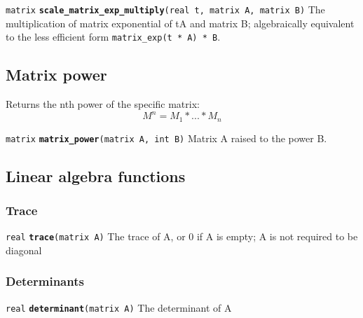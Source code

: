 \documentclass[
  10pt,
]{book}
\begin{document}

\texttt{matrix} \textbf{\texttt{scale\_matrix\_exp\_multiply}}\texttt{(real\ t,\ matrix\ A,\ matrix\ B)}\newline
The multiplication of matrix exponential of tA and matrix B;
algebraically equivalent to the less efficient form \texttt{matrix\_exp(t\ *\ A)\ *\ B}.

\hypertarget{matrix-power}{%
\subsection{Matrix power}\label{matrix-power}}

Returns the nth power of the specific matrix: \[ M^n = M_1 * ... * M_n \]


\texttt{matrix} \textbf{\texttt{matrix\_power}}\texttt{(matrix\ A,\ int\ B)}\newline
Matrix A raised to the power B.

\hypertarget{linear-algebra-functions}{%
\subsection{Linear algebra functions}\label{linear-algebra-functions}}

\hypertarget{trace}{%
\subsubsection{Trace}\label{trace}}


\texttt{real} \textbf{\texttt{trace}}\texttt{(matrix\ A)}\newline
The trace of A, or 0 if A is empty; A is not required to be diagonal

\hypertarget{determinants}{%
\subsubsection{Determinants}\label{determinants}}


\texttt{real} \textbf{\texttt{determinant}}\texttt{(matrix\ A)}\newline
The determinant of A
\end{document}
